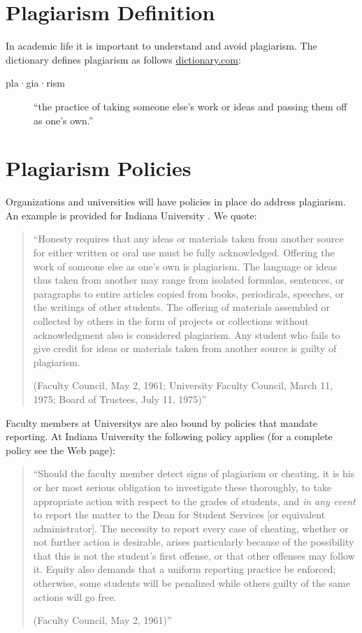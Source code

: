 
\section{Plagiarism Definition}

In academic life it is important to understand and avoid plagiarism.
The dictionary defines plagiarism as follows \url{dictionary.com}:

\begin{description}
\item[pla·gia·rism] ``the practice of taking someone else's work or ideas and passing them
off as one's own.''
\end{description}

\section{Plagiarism Policies}
Organizations and universities will have policies in place do address
plagiarism. An example is provided for Indiana University
\cite{www-iu-plagiarism}. We quote:

\begin{quotation}
``Honesty requires that any ideas or materials taken from
another source for either written or oral use must be fully
acknowledged. Offering the work of someone else as one’s own is
plagiarism. The language or ideas thus taken from another may range
from isolated formulas, sentences, or paragraphs to entire articles
copied from books, periodicals, speeches, or the writings of other
students. The offering of materials assembled or collected by others
in the form of projects or collections without acknowledgment also is
considered plagiarism. Any student who fails to give credit for ideas
or materials taken from another source is guilty of plagiarism. 

(Faculty Council, May 2, 1961; University Faculty Council, March 11,
1975; Board of Trustees, July 11, 1975)''
\end{quotation}

Faculty members at Universitys are also bound by policies that mandate
reporting. At Indiana University the following policy applies (for a
complete policy see the Web page):

\begin{quotation}
``Should
the faculty member detect signs of plagiarism or cheating, it is his
or her most serious obligation to investigate these thoroughly, to
take appropriate action with respect to the grades of students, and
{\em in any event} to report the matter to the Dean for Student Services [or
equivalent administrator]. The necessity to report every case of
cheating, whether or not further action is desirable, arises
particularly because of the possibility that this is not the student’s
first offense, or that other offenses may follow it. Equity also
demands that a uniform reporting practice be enforced; otherwise, some
students will be penalized while others guilty of the same actions
will go free.

(Faculty Council, May 2, 1961)''
\end{quotation}

